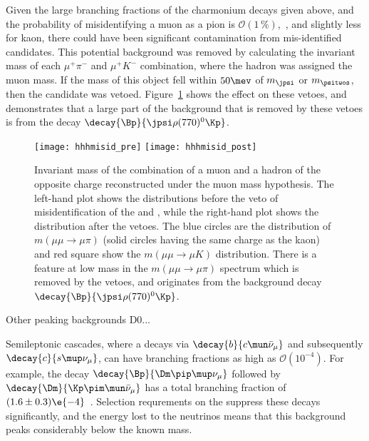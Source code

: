 Given the large branching fractions of the charmonium decays given above, and the probability of
misidentifying a muon as a pion is $\mathcal{O}(1\,\%)$,~\cite{LHCb-DP-2013-001}, and slightly less
for kaon, there could have been significant contamination from mis-identified candidates.
This potential background was removed by calculating the invariant mass of each $\mu^+\pi^-$ and
$\mu^+K^-$ combination, where the hadron was assigned the muon mass.
If the mass of this object fell within $50\mev$ of $m_\jpsi$ or $m_\psitwos$, then the candidate
was vetoed.
Figure~\ref{fig:hhh:misid} shows the effect on these vetoes, and demonstrates that a large part
of the background that is removed by these vetoes is from the decay
$\decay{\Bp}{\jpsi\rho(770)^0\Kp}$.


\begin{figure}
  \begin{center}
    \texttt{[image: hhhmisid\_pre]}
    \texttt{[image: hhhmisid\_post]}
    \caption[Backgrounds from misidentified charmonia]
    {\small
      Invariant mass of the combination of a muon and a hadron of the opposite charge
      reconstructed under the muon mass hypothesis.
      The left-hand plot shows the distributions before the veto of misidentification of the \jpsi
      and \psitwos, while the right-hand plot shows the distribution after the vetoes.
      The blue circles are the distribution of $m(\mu\mu\to\mu\pi)$ (solid circles having the same
      charge as the kaon) and red square show the $m(\mu\mu\to\mu K)$ distribution.
      There is a feature at low mass in the $m(\mu\mu\to\mu\pi)$ spectrum which is removed by the
      vetoes, and originates from the background decay $\decay{\Bp}{\jpsi\rho(770)^0\Kp}$.
    }
    \label{fig:hhh:misid}
  \end{center}
\end{figure}

Other peaking backgrounds D0...


Semileptonic cascades, where a \bquark decays via $\decay{b}{c\mun\bar\nu_\mu}$ and subsequently
$\decay{c}{s\mup\nu_\mu}$, can have branching fractions as high as $\mathcal{O}(10^{-4})$.
For example, the decay $\decay{\Bp}{\Dm\pip\mup\nu_\mu}$ followed by
$\decay{\Dm}{\Kp\pim\mun\bar\nu_\mu}$ has a total branching fraction of
$(1.6\pm0.3)\e{-4}$~\cite{PDG2014}.
Selection requrements on the \chisqvtx suppress these decays significantly, and the energy lost to
the neutrinos means that this background peaks considerably below the known \Bp mass.





